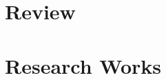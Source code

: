 \documentclass[english,twoside,onecolumn,a4paper,oldfontcommands]{memoir}
\begin{document}

	\frontmatter
		 
		\restoregeometry
		 
		
			
		\thispagestyle{empty} %
		\phantom{blabla}
		\newpage
		\pagestyle{fancy}
        
		
		
		\tableofcontents 
		\clearpage
	
	\mainmatter
		\part{Review}
        \label{part:review}
		
		\part{Research Works}
        \label{part:papers}
		
		
	\backmatter
	\renewcommand*{\bibfont}{\footnotesize}
	\printbibliography
	\renewcommand*{\bibfont}{\raggedright}
	
\end{document}

